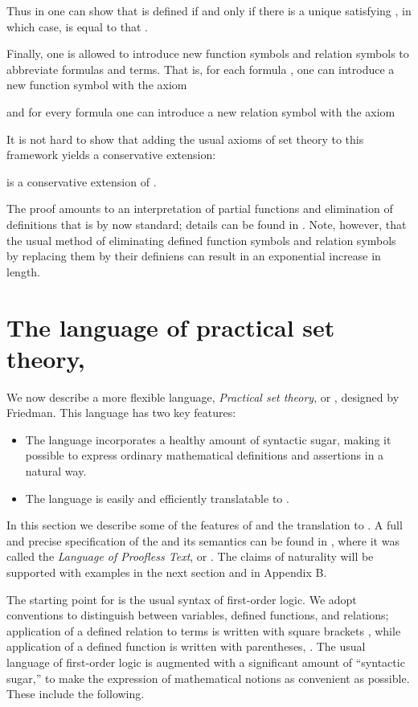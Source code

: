 \documentclass{llncs}
\begin{document}
Thus in  one can show that  is defined if
and only if there is a unique  satisfying , in which case,
 is equal to that . 

Finally, one is allowed to introduce new function symbols and relation
symbols to abbreviate formulas and terms. That is, for each formula
, one can introduce a new function symbol 
with the axiom

and for every formula  one can introduce a new relation
symbol  with the axiom

It is not hard to show that adding the usual axioms of set theory to
this framework yields a conservative extension:

\begin{theorem}
 is a conservative extension of .
\end{theorem}

The proof amounts to an interpretation of partial functions and
elimination of definitions that is by now standard; details can be
found in \cite{troelstra:schwichtenberg:00,kieffer:07}. Note, however,
that the usual method of eliminating defined function symbols and
relation symbols by replacing them by their definiens can result in an
exponential increase in length.

\section{The language of practical set theory, }
\label{PST_section}

We now describe a more flexible language, \emph{Practical set theory},
or , designed by Friedman. This language has two key
features:
\begin{itemize}
\item The language incorporates a healthy amount of syntactic sugar,
  making it possible to express ordinary mathematical definitions and
  assertions in a natural way.
\item The language is easily and efficiently translatable to
  . 
\end{itemize}
In this section we describe some of the features of  and
the translation to . A full and precise specification of
the  and its  semantics can be found in
\cite{kieffer:07,friedman:unp:05}, where it was called the
\emph{Language of Proofless Text}, or .  The claims of
naturality will be supported with examples in the next section and in
Appendix B.

The starting point for  is the usual syntax of first-order
logic. We adopt conventions to distinguish between variables, defined
functions, and relations; application of a defined relation 
to terms  is written with square brackets
, while application of a defined function
 is written with parentheses,
. The usual language of first-order logic is
augmented with a significant amount of ``syntactic sugar,'' to make
the expression of mathematical notions as convenient as
possible. These include the following.
\end{document}
